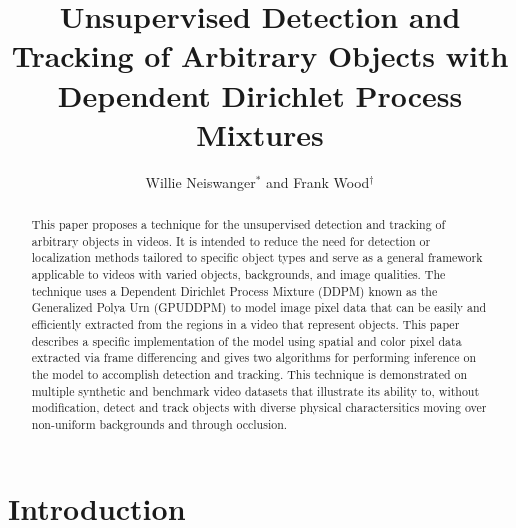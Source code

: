 \documentclass[twocolumn, final]{svjour3}
\begin{document}

\title{Unsupervised Detection and Tracking of Arbitrary Objects with Dependent Dirichlet Process Mixtures}
\author{Willie Neiswanger$^{*}$ and Frank Wood$^{\dagger}$}
\date{}  %
\maketitle



\begin{abstract}
This paper proposes a technique for the unsupervised detection and tracking of arbitrary objects in videos. It is intended to reduce the need for detection or localization methods tailored to specific object types and serve as a general framework applicable to videos with varied objects, backgrounds, and image qualities. The technique uses a Dependent Dirichlet Process Mixture (DDPM) known as the Generalized Polya Urn (GPUDDPM) to model image pixel data that can be easily and efficiently extracted from the regions in a video that represent objects. This paper describes a specific implementation of the model using spatial and color pixel data extracted via frame differencing and gives two algorithms for performing inference on the model to accomplish detection and tracking. This technique is demonstrated on multiple synthetic and benchmark video datasets that illustrate its ability to, without modification, detect and track objects with diverse physical charactersitics moving over non-uniform backgrounds and through occlusion.
\end{abstract}




\section{Introduction}
\label{sec:introduction}
\end{document}
